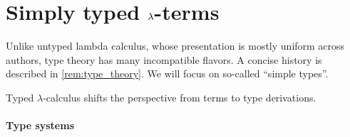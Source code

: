 \section{Simply typed \texorpdfstring{\( {\mathrm \lambda} \)}{λ}-terms}\label{sec:simply_typed_lambda_terms}

Unlike untyped lambda calculus, whose presentation is mostly uniform across authors, type theory has many incompatible flavors. A concise history is described in \cref{rem:type_theory}. We will focus on so-called \enquote{simple types}.

Typed \( \lambda \)-calculus shifts the perspective from terms to type derivations.

\paragraph{Type systems}

